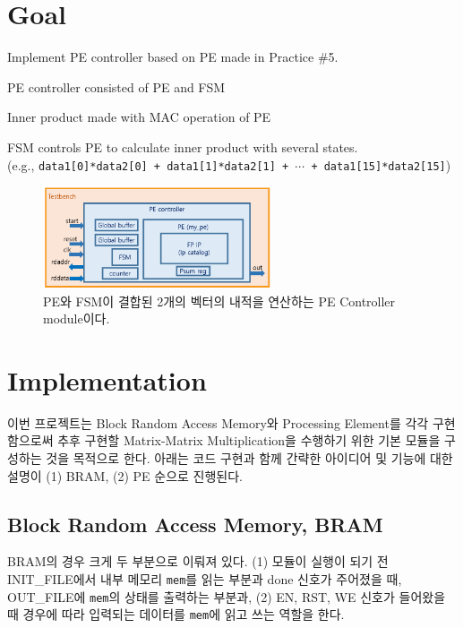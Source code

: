 \documentclass{article}
\begin{document}
\pagestyle{fancy}

\section*{Goal}

\begin{itemize*}
\item Implement PE controller based on PE made in Practice \#5.
\begin{itemize*}
\item PE controller consisted of PE and FSM
\item Inner product made with MAC operation of PE
\end{itemize*}
\item FSM controls PE to calculate inner product with several states. \\
(e.g., \texttt{data1[0]*data2[0] + data1[1]*data2[1] + $\cdots$ + data1[15]*data2[15]})
\end{itemize*}
\begin{figure}[ht]
	\centering
	\includegraphics[width=0.6\textwidth]{fig/fig1.png}
\caption{PE와 FSM이 결합된 2개의 벡터의 내적을 연산하는 PE Controller module이다.}
\label{fig1}
\end{figure}

\section{Implementation}

이번 프로젝트는 Block Random Access Memory와 Processing Element를 각각 구현함으로써 추후 구현할 Matrix-Matrix Multiplication을 수행하기 위한 기본 모듈을 구성하는 것을 목적으로 한다. 아래는 코드 구현과 함께 간략한 아이디어 및 기능에 대한 설명이 (1) BRAM, (2) PE 순으로 진행된다.

\subsection{Block Random Access Memory, BRAM}
BRAM의 경우 크게 두 부분으로 이뤄져 있다. (1) 모듈이 실행이 되기 전 INIT\_FILE에서 내부 메모리 \texttt{mem}를 읽는 부분과 done 신호가 주어졌을 때, OUT\_FILE에 \texttt{mem}의 상태를 출력하는 부분과, (2) EN, RST, WE 신호가 들어왔을 때 경우에 따라 입력되는 데이터를 \texttt{mem}에 읽고 쓰는 역할을 한다.
\end{document}
